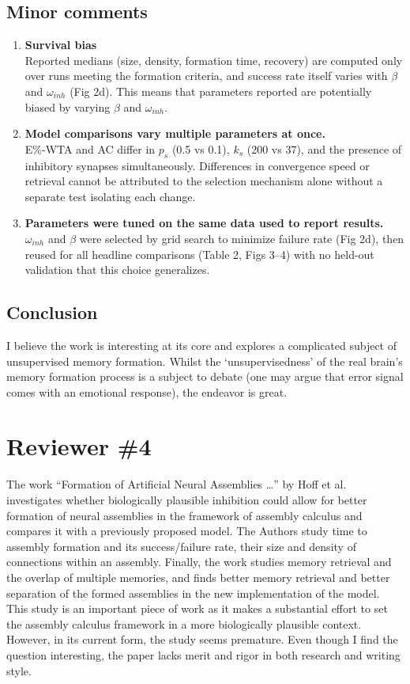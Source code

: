 \documentclass[a4paper, 11pt]{article}
\begin{document}
\subsection*{Minor comments}
\begin{enumerate}
    \item \textbf{Survival bias}\\
    Reported medians (size, density, formation time, recovery) are computed only over runs meeting the formation criteria, and success rate itself varies with $\beta$ and $\omega_{inh}$ (Fig 2d). This means that parameters reported are potentially biased by varying $\beta$ and $\omega_{inh}$.

    \item \textbf{Model comparisons vary multiple parameters at once.}\\
    E\%-WTA and AC differ in $p_s$ (0.5 vs 0.1), $k_s$ (200 vs 37), and the presence of inhibitory synapses simultaneously. Differences in convergence speed or retrieval cannot be attributed to the selection mechanism alone without a separate test isolating each change.

    \item \textbf{Parameters were tuned on the same data used to report results.}\\
    $\omega_{inh}$ and $\beta$ were selected by grid search to minimize failure rate (Fig 2d), then reused for all headline comparisons (Table 2, Figs 3--4) with no held-out validation that this choice generalizes.
\end{enumerate}

\subsection*{Conclusion}
I believe the work is interesting at its core and explores a complicated subject of unsupervised memory formation. Whilst the `unsupervisedness' of the real brain's memory formation process is a subject to debate (one may argue that error signal comes with an emotional response), the endeavor is great.


\section*{Reviewer \#4}

The work ``Formation of Artificial Neural Assemblies \dots'' by Hoff et al. investigates whether biologically plausible inhibition could allow for better formation of neural assemblies in the framework of assembly calculus and compares it with a previously proposed model. The Authors study time to assembly formation and its success/failure rate, their size and density of connections within an assembly. Finally, the work studies memory retrieval and the overlap of multiple memories, and finds better memory retrieval and better separation of the formed assemblies in the new implementation of the model. This study is an important piece of work as it makes a substantial effort to set the assembly calculus framework in a more biologically plausible context. However, in its current form, the study seems premature. Even though I find the question interesting, the paper lacks merit and rigor in both research and writing style.
\end{document}

